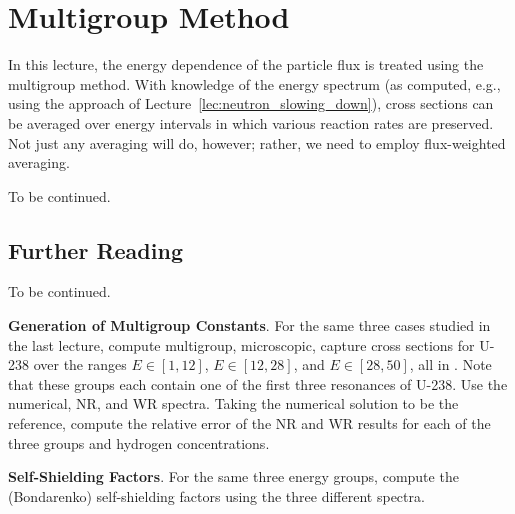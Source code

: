 \chapter{Multigroup Method}
\label{lec:multigroup_method}

In this lecture, the energy dependence of the particle flux is 
treated using the multigroup method.  With knowledge of the 
energy spectrum (as computed, e.g., using the approach of 
Lecture~\ref{lec:neutron_slowing_down}), cross sections can be 
averaged over energy intervals in which various reaction 
rates are preserved.  Not just any averaging will do, however; rather, we
need to employ flux-weighted averaging.

To be continued.

\section*{Further Reading}

To be continued.

\begin{exercises}

  \item \textbf{Generation of Multigroup Constants}.
    For the same three cases studied in the last lecture, 
    compute multigroup, microscopic, capture 
    cross sections for U-238 over the 
    ranges $E\in[1, 12]$, $E\in[12, 28]$, and $E\in [28, 50]$, all in 
    \electronvolt.  Note that these groups each contain one of the 
    first three resonances of U-238.  
    Use the numerical, NR, and WR spectra.  Taking 
    the numerical solution to be the reference, compute the relative 
    error of the NR and WR results for each of the three groups and
    hydrogen concentrations.
    
  \item \textbf{Self-Shielding Factors}.
    For the same three energy groups, compute the (Bondarenko) self-shielding 
    factors using the three different spectra.
    
  
\end{exercises}
